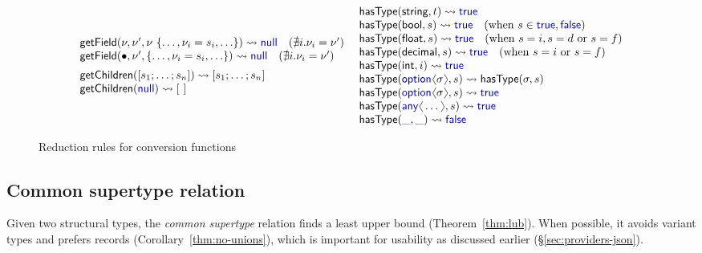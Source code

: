 \documentclass[10pt,preprint,blind,clearpagebib]{sigplanconf}
\newcommand{\langl}{\begin{picture}(4.5,7)
\put(1.1,2.5){\rotatebox{60}{\line(1,0){5.5}}}
\put(1.1,2.5){\rotatebox{300}{\line(1,0){5.5}}}
\end{picture}}
\newcommand{\rangl}{\begin{picture}(4.5,7)
\put(.9,2.5){\rotatebox{120}{\line(1,0){5.5}}}
\put(.9,2.5){\rotatebox{240}{\line(1,0){5.5}}}
\end{picture}}
\newcommand{\kvd}[1]{\textnormal{\textcolor{kvdclr}{\sffamily #1}}}
\newcommand{\ident}[1]{\textnormal{\sffamily #1}}
\newcommand{\reduce}{\rightsquigarrow}
\begin{document}
\begin{figure}
\begin{equation*}
\begin{array}{l}
\ident{getField}(\nu,\nu', \nu~\{\ldots, \nu_i=s_i, \ldots\}) \reduce \kvd{null}\quad(\nexists i.\nu_i=\nu' )\\
\ident{getField}(\bullet, \nu', \{\ldots, \nu_i=s_i, \ldots\}) \reduce \kvd{null}\quad(\nexists i.\nu_i=\nu' )
\\[0.5em]
\ident{getChildren}([s_1; \ldots; s_n]) \reduce [s_1; \ldots; s_n]  \\  
\ident{getChildren}(\kvd{null}) \reduce [~] 
\end{array}
~
\begin{array}{l}
\ident{hasType}(\ident{string}, t) \reduce \kvd{true} \\
\ident{hasType}(\ident{bool}, s) \reduce \kvd{true} \quad(\textnormal{when}~s\in{\kvd{true},\kvd{false}} )\\
\ident{hasType}(\ident{float}, s) \reduce \kvd{true} \quad(\textnormal{when}~s=i, s=d ~\textnormal{or}~ s=f) \\
\ident{hasType}(\ident{decimal}, s) \reduce \kvd{true} \quad(\textnormal{when}~s=i ~\textnormal{or}~ s=f) \\
\ident{hasType}(\ident{int}, i) \reduce \kvd{true}\\
\ident{hasType}(\kvd{option}\langl\sigma\rangl, s) \reduce \ident{hasType}(\sigma,s) \\
\ident{hasType}(\kvd{option}\langl\sigma\rangl, s) \reduce \kvd{true} \\
\ident{hasType}(\kvd{any}\langl\ldots\rangl, s) \reduce \kvd{true} \\
\ident{hasType}(\_, \_) \reduce \kvd{false} \\
\end{array}
\end{equation*}

\caption{Reduction rules for conversion functions}
\label{fig:op-conversions}
\end{figure}


\subsection{Common supertype relation}
\label{sec:inference-commonsuper}

Given two structural types, the \emph{common supertype} relation finds a least upper bound
(Theorem~\ref{thm:lub}). When possible, it avoids variant types and prefers records 
(Corollary~\ref{thm:no-unions}), which is important for usability as discussed earlier
(\S\ref{sec:providers-json}). 
\end{document}
